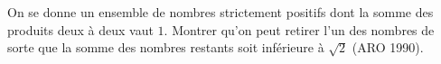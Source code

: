 On se donne un ensemble de nombres strictement positifs dont la somme des produits deux à deux vaut $1$. Montrer qu'on peut retirer l'un des nombres de sorte que la somme des nombres restants soit inférieure à $\sqrt{2}$ (ARO 1990).
